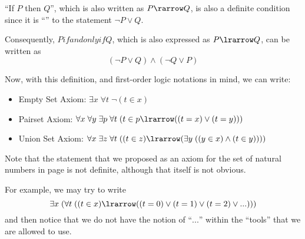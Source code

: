 \documentclass[notoc,notitlepage]{tufte-book}
\begin{document}
\begin{note}
  ``If $P$ then $Q$'', which is also written as $P \rarrow Q$, is also a definite condition since it is ``'' to the statement $\neg P \lor Q$.

  Consequently, $P if and only if Q$, which is also expressed as $P \lrarrow Q$, can be written as
  \begin{equation*}
    (\neg P \lor Q) \land (\neg Q \lor P)
  \end{equation*}
\end{note}

Now, with this definition, and first-order logic notations in mind, we can write:

\begin{itemize}
  \item Empty Set Axiom: $\exists x \; \forall t \; \neg ( t \in x )$
  \item Pairset Axiom: $\forall x \; \forall y \; \exists p \; \forall t \; ( t \in p \lrarrow ( ( t = x ) \lor ( t = y ) ) )$
    \item Union Set Axiom: $\forall x \; \exists z \; \forall t \; ( ( t \in z ) \lrarrow ( \exists y \; ( (y \in x) \land ( t \in y ) ) ) )$
\end{itemize}

Note that the statement that we proposed as an axiom for the set of natural numbers in page \pageref{sp:natural_numbers_axiom} is not definite, although that itself is not obvious.

For example, we may try to write
\begin{equation*}
  \exists x \; ( \forall t \; ( ( t \in x ) \lrarrow ( (t = 0) \lor (t = 1) \lor ( t = 2 ) \lor ... ) ) )
\end{equation*}
and then notice that we do not have the notion of ``$...$'' within the ``tools'' that we are allowed to use.
\end{document}
